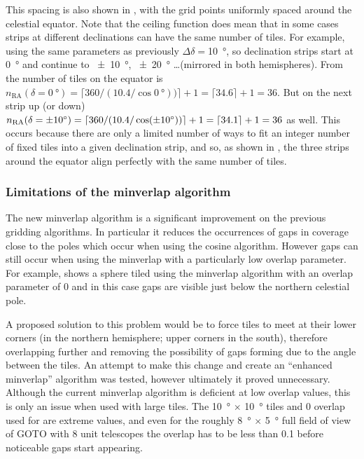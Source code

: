 \begin{colsection}
\begin{colsection}
This spacing is also shown in , with the grid points uniformly spaced around the celestial equator. Note that the ceiling function does mean that in some cases strips at different declinations can have the same number of tiles. For example, using the same parameters as previously $\Delta\delta=$\SI{10}{\degree}, so declination strips start at \SI{0}{\degree} and continue to \SI{\pm10}{\degree}, \SI{\pm20}{\degree} \ldots (mirrored in both hemispheres). From  the number of tiles on the equator is $n_\text{RA}(\delta=\SI{0}{\degree}) = \lceil 360/(10.4/\cos \SI{0}{\degree})) \rceil + 1 = \lceil 34.6 \rceil + 1 = 36$. But on the next strip up (or down) $n_\text{RA}(\delta=\SI{\pm10}{\degree}) = \lceil 360/(10.4/\cos(\pm\SI{10}{\degree})) \rceil + 1 = \lceil 34.1 \rceil + 1 = 36$ as well. This occurs because there are only a limited number of ways to fit an integer number of fixed tiles into a given declination strip, and so, as shown in , the three strips around the equator align perfectly with the same number of tiles.

\subsubsection{Limitations of the minverlap algorithm}

The new minverlap algorithm is a significant improvement on the previous gridding algorithms. In particular it reduces the occurrences of gaps in coverage close to the poles which occur when using the cosine algorithm. However gaps can still occur when using the minverlap with a particularly low overlap parameter. For example,  shows a sphere tiled using the minverlap algorithm with an overlap parameter of 0 and in this case gaps are visible just below the northern celestial pole.

A proposed solution to this problem would be to force tiles to meet at their lower corners (in the northern hemisphere; upper corners in the south), therefore overlapping further and removing the possibility of gaps forming due to the angle between the tiles. An attempt to make this change and create an ``enhanced minverlap'' algorithm was tested, however ultimately it proved unnecessary. Although the current minverlap algorithm is deficient at low overlap values, this is only an issue when used with large tiles. The \SI{10}{\degree} $\times$ \SI{10}{\degree} tiles and 0 overlap used for  are extreme values, and even for the roughly \SI{8}{\degree} $\times$ \SI{5}{\degree} full field of view of GOTO with 8 unit telescopes the overlap has to be less than 0.1 before noticeable gaps start appearing.


\end{colsection}
\end{colsection}
